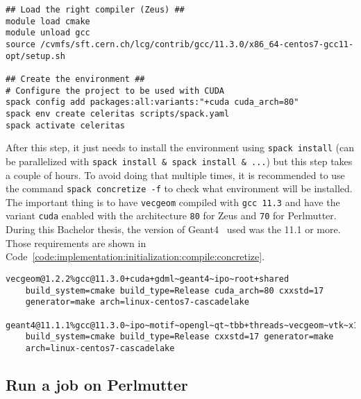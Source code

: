 \begin{code}
    \label{code:implementation:initialization:compile:pre-steps}
    \begin{verbatim}
## Load the right compiler (Zeus) ##
module load cmake
module unload gcc
source /cvmfs/sft.cern.ch/lcg/contrib/gcc/11.3.0/x86_64-centos7-gcc11-opt/setup.sh

## Create the environment ##
# Configure the project to be used with CUDA
spack config add packages:all:variants:"+cuda cuda_arch=80"
spack env create celeritas scripts/spack.yaml
spack activate celeritas
    \end{verbatim}
\end{code}

After this step, it just needs to install the environment using
\texttt{spack install} (can be parallelized with \texttt{spack install \& spack install \& ...})
but this step takes a couple of hours.
To avoid doing that multiple times, it is recommended to use the command
\texttt{spack concretize -f} to check what environment will be installed.
The important thing is to have \texttt{vecgeom} compiled with \texttt{gcc 11.3}
and have the variant \texttt{cuda} enabled with the architecture \texttt{80} for
Zeus and \texttt{70} for Perlmutter.
During this Bachelor thesis, the version of Geant4~\cite{geant4} used was the
11.1 or more.
Those requirements are shown in Code~\ref{code:implementation:initialization:compile:concretize}.

\begin{code}
    \label{code:implementation:initialization:compile:concretize}
    \begin{verbatim}
vecgeom@1.2.2%gcc@11.3.0+cuda+gdml~geant4~ipo~root+shared
    build_system=cmake build_type=Release cuda_arch=80 cxxstd=17
    generator=make arch=linux-centos7-cascadelake

geant4@11.1.1%gcc@11.3.0~ipo~motif~opengl~qt~tbb+threads~vecgeom~vtk~x11
    build_system=cmake build_type=Release cxxstd=17 generator=make
    arch=linux-centos7-cascadelake
    \end{verbatim}
\end{code}


\subsection{Run a job on Perlmutter}
\label{ch:implementation:initialization:perlmutter}

